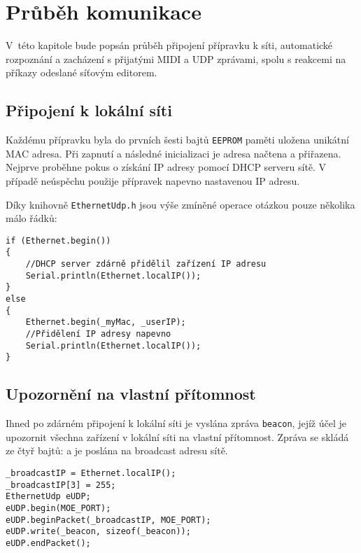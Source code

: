 \chapter{Průběh komunikace}
V~této kapitole bude popsán průběh připojení přípravku k síti, automatické rozpoznání a zacházení s přijatými \acs{MIDI} a \acs{UDP} zprávami, spolu s reakcemi na příkazy odeslané síťovým editorem.

\section{Připojení k lokální síti}
Každému přípravku byla do prvních šesti bajtů \texttt{EEPROM} paměti uložena unikátní MAC adresa. Při zapnutí a následné inicializaci je adresa načtena a přiřazena. Nejprve proběhne pokus o získání IP adresy pomocí DHCP serveru sítě. V případě neúspěchu použije přípravek napevno nastavenou IP adresu. 

Díky knihovně \texttt{EthernetUdp.h} jsou výše zmíněné operace otázkou pouze několika málo řádků:

\begin{lstlisting}
if (Ethernet.begin())
{
    //DHCP server zdárně přidělil zařízení IP adresu
    Serial.println(Ethernet.localIP());
}
else
{
    Ethernet.begin(_myMac, _userIP);
    //Přidělení IP adresy napevno
    Serial.println(Ethernet.localIP());
}
\end{lstlisting}






\section{Upozornění na vlastní přítomnost}
Ihned po zdárném připojení k lokální síti je vyslána zpráva  \texttt{beacon}, jejíž účel je upozornit všechna zařízení v lokální síti na vlastní přítomnost. Zpráva se skládá ze čtyř bajtů:
a je poslána na broadcast adresu sítě.

\begin{lstlisting}
_broadcastIP = Ethernet.localIP();
_broadcastIP[3] = 255;
EthernetUdp eUDP;
eUDP.begin(MOE_PORT);
eUDP.beginPacket(_broadcastIP, MOE_PORT);
eUDP.write(_beacon, sizeof(_beacon));
eUDP.endPacket();
\end{lstlisting}

